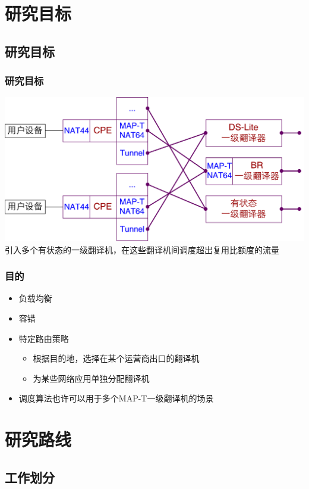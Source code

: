 \documentclass{beamer}
\begin{document}
\section{研究目标}
\subsection{研究目标}
\begin{frame}
  \frametitle{研究目标}

  \includegraphics[width=\textwidth]{figs/MAP-T-Multiple-DS-Lite.pdf}  
  \vspace{1.5em}
  引入多个有状态的一级翻译机，在这些翻译机间调度超出复用比额度的流量
\end{frame}

\begin{frame}
  \frametitle{目的}
  \begin{itemize}
  \item 负载均衡
  \item 容错
  \item 特定路由策略
    \begin{itemize}
    \item 根据目的地，选择在某个运营商出口的翻译机
    \item 为某些网络应用单独分配翻译机
    \end{itemize}
  \item 调度算法也许可以用于多个MAP-T一级翻译机的场景
  \end{itemize}
\end{frame}

\section{研究路线}
\subsection{工作划分}
\end{document}
